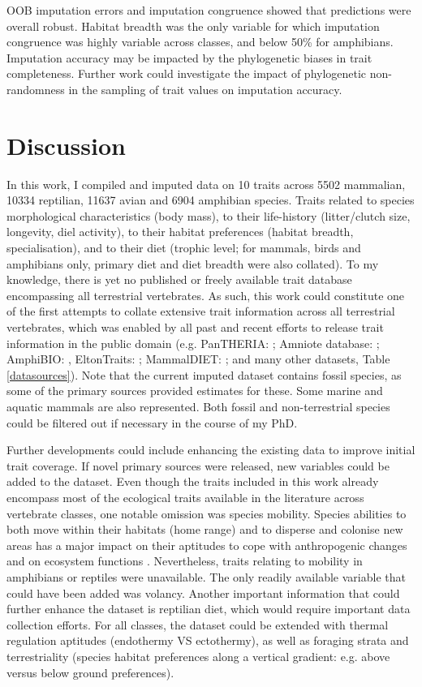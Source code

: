 OOB imputation errors and imputation congruence showed that predictions were overall robust. Habitat breadth was the only variable for which imputation congruence was highly variable across classes, and below 50\% for amphibians. Imputation accuracy may be impacted by the phylogenetic biases in trait completeness. Further work could investigate the impact of phylogenetic non-randomness in the sampling of trait values on imputation accuracy. 

\section{Discussion}

In this work, I compiled and imputed data on 10 traits across 5502 mammalian, 10334 reptilian, 11637 avian and 6904 amphibian species. Traits related to species morphological characteristics (body mass), to their life-history (litter/clutch size, longevity, diel activity), to their habitat preferences (habitat breadth, specialisation), and to their diet (trophic level; for mammals, birds and amphibians only, primary diet and diet breadth were also collated). To my knowledge, there is yet no published or freely available trait database encompassing all terrestrial vertebrates. As such, this work could constitute one of the first attempts to collate extensive trait information across all terrestrial vertebrates, which was enabled by all past and recent efforts to release trait information in the public domain (e.g. PanTHERIA: \citet{Jones2009}; Amniote database: \citet{Myhrvold2015}; AmphiBIO: \citet{Oliveira2017}, EltonTraits: \citet{Wilman2014}; MammalDIET: \citet{Kissling2014}; and many other datasets, Table \ref{datasources}). Note that the current imputed dataset contains fossil species, as some of the primary sources provided estimates for these. Some marine and aquatic mammals are also represented. Both fossil and non-terrestrial species could be filtered out if necessary in the course of my PhD.

Further developments could include enhancing the existing data to improve initial trait coverage. If novel primary sources were released, new variables could be added to the dataset. Even though the traits included in this work already encompass most of the ecological traits available in the literature across vertebrate classes, one notable omission was species mobility. Species abilities to both move within their habitats (home range) and to disperse and colonise new areas has a major impact on their aptitudes to cope with anthropogenic changes and on ecosystem functions \citep{Tucker2018, Schloss2012}. Nevertheless, traits relating to mobility in amphibians or reptiles were unavailable. The only readily available variable that could have been added was volancy. Another important information that could further enhance the dataset is reptilian diet, which would require important data collection efforts. For all classes, the dataset could be extended with thermal regulation aptitudes (endothermy VS ectothermy), as well as foraging strata and terrestriality (species habitat preferences along a vertical gradient: e.g. above versus below ground preferences).

